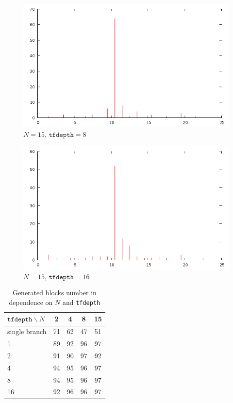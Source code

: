 \documentclass[12pt]{article}
\begin{document}
\begin{figure}[H]
\centering
\caption{$N=15$, $\texttt{tfdepth}=8$}
\includegraphics[scale=0.6]{times15-8.png}
\end{figure} 

\begin{figure}[H]
\centering
\caption{$N=15$, $\texttt{tfdepth}=16$}
\includegraphics[scale=0.6]{times15-16.png}
\end{figure} 

\begin{table}[H]
\caption{Generated blocks number in dependence on $N$ and \texttt{tfdepth}}
\begin{center}
\begin{tabular}{|l|c|c|c|c|}
\hline
$\texttt{tfdepth}\backslash N$ & 2 & 4 & 8 & 15\\
\hline
single branch & 71 & 62 & 47 & 51 \\
1 & 89 & 92 & 96 & 97\\
2 & 91 & 90 & 97 & 92\\
4 & 94 & 95 & 96 & 97\\
8 & 94 & 95 & 96 & 97\\
16 & 92 & 96 & 96 & 97\\
\hline
\end{tabular}
\end{center}
\end{table}
\end{document}
